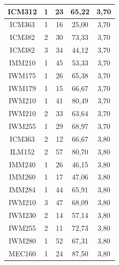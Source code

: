 \documentclass[12pt]{article}
\begin{document}
\begin{table}[H]
{{\begin{minipage}[b]{.5\hsize}
{\begin{tabular}{|c|c|c|c|c|}
            \rowcolor[HTML]{DAEBFB} 
            ICM312 & 1 & 23 & 65,22 & 3,70 \\ \hline
            \rowcolor[HTML]{DAEBFB} 
            ICM363 & 1 & 16 & 25,00 & 3,70 \\ \hline
            \rowcolor[HTML]{DAEBFB} 
            ICM382 & 2 & 30 & 73,33 & 3,70 \\ \hline
            \rowcolor[HTML]{DAEBFB} 
            ICM382 & 3 & 34 & 44,12 & 3,70 \\ \hline
            \rowcolor[HTML]{DAEBFB} 
            IMM210 & 1 & 45 & 53,33 & 3,70 \\ \hline
            \rowcolor[HTML]{DAEBFB} 
            IWM175 & 1 & 26 & 65,38 & 3,70 \\ \hline
            \rowcolor[HTML]{DAEBFB} 
            IWM179 & 1 & 15 & 66,67 & 3,70 \\ \hline
            \rowcolor[HTML]{DAEBFB} 
            IWM210 & 1 & 41 & 80,49 & 3,70 \\ \hline
            \rowcolor[HTML]{DAEBFB} 
            IWM210 & 2 & 33 & 63,64 & 3,70 \\ \hline
            \rowcolor[HTML]{DAEBFB} 
            IWM255 & 1 & 29 & 68,97 & 3,70 \\ \hline
            \rowcolor[HTML]{DAEBFB} 
            ICM363 & 2 & 12 & 66,67 & 3,80 \\ \hline
            \rowcolor[HTML]{DAEBFB} 
            ILM152 & 2 & 57 & 80,70 & 3,80 \\ \hline
            \rowcolor[HTML]{DAEBFB} 
            IMM240 & 1 & 26 & 46,15 & 3,80 \\ \hline
            \rowcolor[HTML]{DAEBFB} 
            IMM260 & 1 & 17 & 47,06 & 3,80 \\ \hline
            \rowcolor[HTML]{DAEBFB} 
            IMM284 & 1 & 44 & 65,91 & 3,80 \\ \hline
            \rowcolor[HTML]{DAEBFB} 
            IWM210 & 3 & 47 & 68,09 & 3,80 \\ \hline
            \rowcolor[HTML]{DAEBFB} 
            IWM230 & 2 & 14 & 57,14 & 3,80 \\ \hline
            \rowcolor[HTML]{DAEBFB} 
            IWM255 & 2 & 11 & 72,73 & 3,80 \\ \hline
            \rowcolor[HTML]{DAEBFB} 
            IWM280 & 1 & 52 & 67,31 & 3,80 \\ \hline
            \rowcolor[HTML]{DAEBFB} 
            MEC160 & 1 & 24 & 87,50 & 3,80 \\ \hline

\end{tabular}}
\end{minipage}}}
\end{table}
\end{document}
